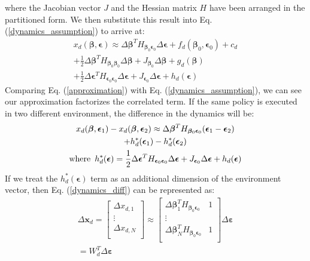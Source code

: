 \documentclass[journal]{IEEEtran}
\begin{document}
where the Jacobian vector $J$ and the Hessian matrix $H$ have been arranged in the partitioned form.
We then substitute this result into Eq. (\ref{dynamics_assumption}) to arrive at:
\begin{equation}
\begin{gathered}
x_d(\bm{\beta}, \bm{\epsilon}) \approx
\Delta \bm{\beta}^T H_{\bm{\beta}_0 \bm{\epsilon}_0} 
\Delta \bm{\epsilon}
+ f_d(\bm{\beta}_0, \bm{\epsilon}_0) + c_d
\\ + 
\frac{1}{2} \Delta \bm{\beta}^T H_{\bm{\beta}_0 \bm{\beta}_0} 
\Delta \bm{\beta} 
+ J_{\bm{\beta}_0} \Delta \bm{\beta}
+ g_d(\bm{\beta}) 
\\
+ \frac{1}{2} \Delta \bm{\epsilon}^T H_{\bm{\epsilon}_0 \bm{\epsilon}_0} \Delta \bm{\epsilon}
+ J_{\bm{\epsilon}_0} \Delta \bm{\epsilon}
+ h_d(\bm{\epsilon}) 
\end{gathered}
\label{approximation}
\end{equation}
%
Comparing Eq. (\ref{approximation}) with Eq. (\ref{dynamics_assumption}), we can see our approximation factorizes the correlated term. If the same policy is executed in two different environment, the difference in the dynamics will be:
\begin{equation}
\begin{gathered}
x_d(\bm{\beta}, \bm{\epsilon}_1) - 
x_d(\bm{\beta}, \bm{\epsilon}_2) \approx
\Delta \bm{\beta}^T H_{\bm{\beta}_0 \bm{\epsilon}_0} 
(\bm{\epsilon}_1 - \bm{\epsilon}_2)
\\
+ h^*_d(\bm{\epsilon}_1) - h^*_d(\bm{\epsilon}_2) 
\\
\text{where \,}
h^*_d(\bm{\epsilon}) = 
\frac{1}{2} \Delta \bm{\epsilon}^T H_{\bm{\epsilon}_0 \bm{\epsilon}_0} \Delta \bm{\epsilon}
+ J_{\bm{\epsilon}_0} \Delta \bm{\epsilon}
+ h_d(\bm{\epsilon}) 
\end{gathered}
\label{dynamics_diff}
\end{equation}
If we treat the $h^*_d(\bm{\epsilon})$ term as an additional dimension of the environment vector, then Eq. (\ref{dynamics_diff}) can be represented as:
\begin{equation}
\begin{gathered}
\Delta \bm{x}_d = 
\begin{bmatrix}
\Delta x_{d, 1} \\
\vdots \\
\Delta x_{d, N} \\
\end{bmatrix}
\approx
\begin{bmatrix}
\Delta \bm{\beta}_1^T H_{\bm{\beta}_0 \bm{\epsilon}_0} & 1 \\
\vdots \\
\Delta \bm{\beta}_N^T H_{\bm{\beta}_0 \bm{\epsilon}_0} & 1 \\
\end{bmatrix}
\Delta \bm{\varepsilon} 
\\
= W_{d}^T \Delta \bm{\varepsilon}
\end{gathered}
\label{linear_form}
\end{equation}
\end{document}
